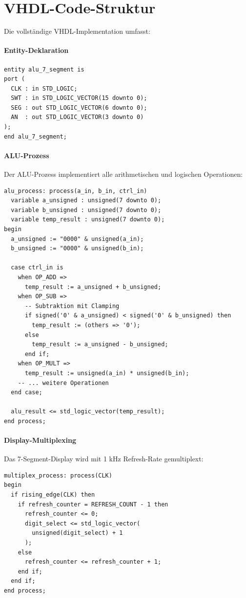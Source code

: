 ﻿\documentclass[12pt,a4paper]{report}
\begin{document}
\section{VHDL-Code-Struktur}

Die vollständige VHDL-Implementation umfasst:

\paragraph{Entity-Deklaration}
\begin{lstlisting}[style=hdlstyle, caption={VHDL Entity}]
entity alu_7_segment is
port (
  CLK : in STD_LOGIC;
  SWT : in STD_LOGIC_VECTOR(15 downto 0);
  SEG : out STD_LOGIC_VECTOR(6 downto 0);
  AN  : out STD_LOGIC_VECTOR(3 downto 0)
);
end alu_7_segment;
\end{lstlisting}

\paragraph{ALU-Prozess}
Der ALU-Prozess implementiert alle arithmetischen und logischen Operationen:

\begin{lstlisting}[style=hdlstyle, caption={ALU-Operationen in VHDL}]
alu_process: process(a_in, b_in, ctrl_in)
  variable a_unsigned : unsigned(7 downto 0);
  variable b_unsigned : unsigned(7 downto 0);
  variable temp_result : unsigned(7 downto 0);
begin
  a_unsigned := "0000" & unsigned(a_in);
  b_unsigned := "0000" & unsigned(b_in);
  
  case ctrl_in is
    when OP_ADD =>
      temp_result := a_unsigned + b_unsigned;
    when OP_SUB =>
      -- Subtraktion mit Clamping
      if signed('0' & a_unsigned) < signed('0' & b_unsigned) then
        temp_result := (others => '0');
      else
        temp_result := a_unsigned - b_unsigned;
      end if;
    when OP_MULT =>
      temp_result := unsigned(a_in) * unsigned(b_in);
    -- ... weitere Operationen
  end case;
  
  alu_result <= std_logic_vector(temp_result);
end process;
\end{lstlisting}

\paragraph{Display-Multiplexing}
Das 7-Segment-Display wird mit 1 kHz Refresh-Rate gemultiplext:

\begin{lstlisting}[style=hdlstyle, caption={Display-Multiplexing}]
multiplex_process: process(CLK)
begin
  if rising_edge(CLK) then
    if refresh_counter = REFRESH_COUNT - 1 then
      refresh_counter <= 0;
      digit_select <= std_logic_vector(
        unsigned(digit_select) + 1
      );
    else
      refresh_counter <= refresh_counter + 1;
    end if;
  end if;
end process;
\end{lstlisting}
\end{document}
